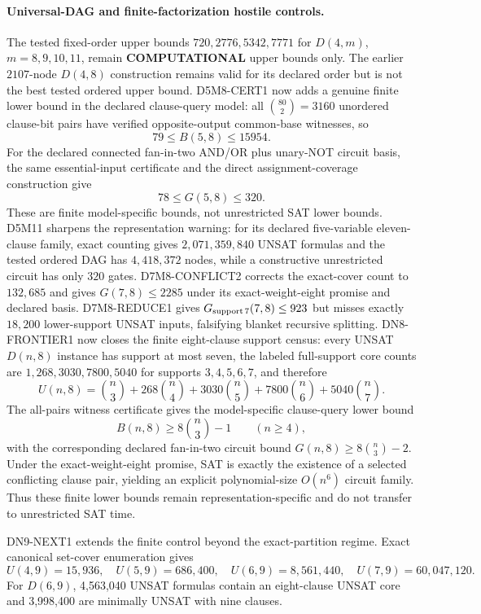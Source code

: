 \documentclass[11pt]{article}
\begin{document}
\paragraph{Universal-DAG and finite-factorization hostile controls.}
The tested fixed-order upper bounds \(720,2776,5342,7771\) for \(D(4,m)\),
\(m=8,9,10,11\), remain \textbf{COMPUTATIONAL} upper bounds only. The earlier
\(2107\)-node \(D(4,8)\) construction remains valid for its declared order but is not the
best tested ordered upper bound. D5M8-CERT1 now adds a genuine finite lower bound in the
declared clause-query model: all \(\binom{80}{2}=3160\) unordered clause-bit pairs have
verified opposite-output common-base witnesses, so
\[
79\le B(5,8)\le15954.
\]
For the declared connected fan-in-two AND/OR plus unary-NOT circuit basis, the same
essential-input certificate and the direct assignment-coverage construction give
\[
78\le G(5,8)\le320.
\]
These are finite model-specific bounds, not unrestricted SAT lower bounds. D5M11 sharpens
the representation warning: for its declared five-variable eleven-clause family, exact counting
gives \(2{,}071{,}359{,}840\) UNSAT formulas and the tested ordered DAG has
\(4{,}418{,}372\) nodes, while a constructive unrestricted circuit has only \(320\) gates.
D7M8-CONFLICT2 corrects the exact-cover count to \(132{,}685\) and gives
\(G(7,8)\le2285\) under its exact-weight-eight promise and declared basis. D7M8-REDUCE1
gives \(G_{\rm support\,7}(7,8)\le923\) but misses exactly \(18{,}200\) lower-support
UNSAT inputs, falsifying blanket recursive splitting. DN8-FRONTIER1 now closes the finite
eight-clause support census: every UNSAT \(D(n,8)\) instance has support at most seven,
the labeled full-support core counts are \(1,268,3030,7800,5040\) for supports
\(3,4,5,6,7\), and therefore
\[
U(n,8)=\binom n3+268\binom n4+3030\binom n5+7800\binom n6+5040\binom n7.
\]
The all-pairs witness certificate gives the model-specific clause-query lower bound
\[
B(n,8)\ge 8\binom n3-1\qquad(n\ge4),
\]
with the corresponding declared fan-in-two circuit bound
\(G(n,8)\ge8\binom n3-2\). Under the exact-weight-eight promise, SAT is exactly the
existence of a selected conflicting clause pair, yielding an explicit polynomial-size
\(O(n^6)\) circuit family. Thus these finite lower bounds remain representation-specific
and do not transfer to unrestricted SAT time.

DN9-NEXT1 extends the finite control beyond the exact-partition regime. Exact canonical
set-cover enumeration gives
\[
U(4,9)=15{,}936,\quad U(5,9)=686{,}400,\quad
U(6,9)=8{,}561{,}440,\quad U(7,9)=60{,}047{,}120.
\]
For \(D(6,9)\), 4,563,040 UNSAT formulas contain an eight-clause UNSAT core and
3,998,400 are minimally UNSAT with nine clauses.
\end{document}
